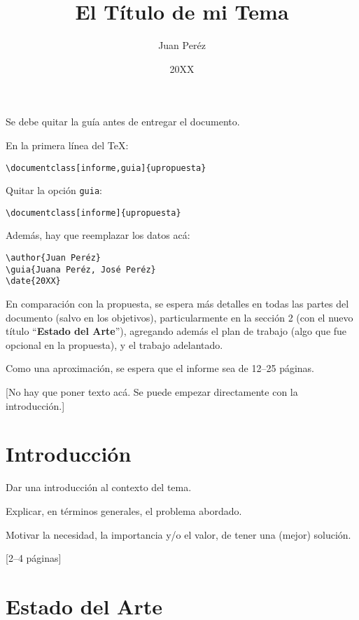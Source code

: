 \documentclass[informe,guia]{upropuesta}
\title{El Título de mi Tema}
\author{Juan Peréz}
\date{20XX}
\begin{document}
\maketitle

\begin{pauta}
Se debe quitar la guía antes de entregar el documento.

En la primera línea del \TeX: 

\begin{verbatim}
\documentclass[informe,guia]{upropuesta}
\end{verbatim}

Quitar la opción \texttt{guia}:

\begin{verbatim}
\documentclass[informe]{upropuesta}
\end{verbatim}

Además, hay que reemplazar los datos acá:

\begin{verbatim}
\author{Juan Peréz}
\guia{Juana Peréz, José Peréz}
\date{20XX}
\end{verbatim}

En comparación con la propuesta, se espera más detalles en todas las partes del documento (salvo en los objetivos), particularmente en la sección 2 (con el nuevo título ``\textbf{Estado del Arte}''), agregando además el plan de trabajo (algo que fue opcional en la propuesta), y el trabajo adelantado. 

Como una aproximación, se espera que el informe sea de 12--25 páginas.

[No hay que poner texto acá. Se puede empezar directamente con la introducción.]
\end{pauta}

\section{Introducción}\label{sec:intro}

\begin{pauta}
Dar una introducción al contexto del tema.

Explicar, en términos generales, el problema abordado.

Motivar la necesidad, la importancia y/o el valor, de tener una (mejor) solución.

[2--4 páginas]
\end{pauta}

\section{Estado del Arte}\label{sec:sa}
\end{document}
